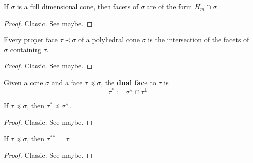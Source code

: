 \begin{proposition}
  \label{1-2-8-facet-full-dim-cone}

  If $\sigma$ is a full dimensional cone, then facets of $\sigma$ are of the form $H_m \cap \sigma$.
\end{proposition}
\begin{proof}
  \uses{}

  Classic. See \cite{Oda_1988} maybe.
\end{proof}


\begin{proposition}
  \label{1-2-8-inter-facet}

  Every proper face $\tau \prec \sigma$ of a polyhedral cone $\sigma$ is the intersection of the facets of $\sigma$ containing $\tau$.
\end{proposition}
\begin{proof}
  \uses{}

  Classic. See \cite{Oda_1988} maybe.
\end{proof}


\begin{definition}
  \label{1-2-10-dual-face}

  Given a cone $\sigma$ and a face $\tau \preceq \sigma$, the {\bf dual face} to $\tau$ is
  $$\tau^* := \sigma^\vee \cap \tau^\perp$$
\end{definition}


\begin{proposition}
  \label{1-2-10-dual-face-face-dual}

  If $\tau \preceq \sigma$, then $\tau^* \preceq \sigma^\vee$.
\end{proposition}
\begin{proof}
  \uses{}

  Classic. See \cite{Oda_1988} maybe.
\end{proof}


\begin{proposition}
  \label{1-2-10-double-dual-face-dual-face}

  If $\tau \preceq \sigma$, then $\tau^{**} = \tau$.
\end{proposition}
\begin{proof}

  Classic. See \cite{Oda_1988} maybe.
\end{proof}


